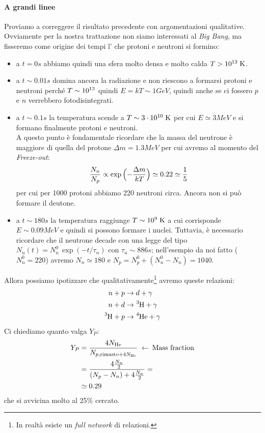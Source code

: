 \paragraph{A grandi linee}\label{a.grandi.linee} Proviamo a correggere il risultato precedente con argomentazioni qualitative. Ovviamente per la nostra trattazione non siamo interessati al \textit{Big Bang}, ma fisseremo come origine dei tempi l' che protoni e neutroni si formino: 
\begin{itemize}
    \item a $t=0\unit{s}$ abbiamo quindi una sfera molto densa e molto calda $T>10^{13}\;\mbox{K}$.  
    \item a $t\sim 0.01\unit{s}$ domina ancora la radiazione e non riescono a formarsi protoni e neutroni perché $T\sim10^{13}$ quindi $E=kT\sim 1\unit{GeV}$, quindi anche se ci fossero $p$ e $n$ verrebbero fotodisintegrati.
    \item a $t\sim 0.1\unit{s}$ la temperatura scende a $T\sim 3\cdot10^{10}\;\mbox{K}$ per cui $E\simeq 3\unit{MeV}$ e si formano finalmente protoni e neutroni.\\ 
    A questo punto è fondamentale ricordare che la massa del neutrone è maggiore di quella del protone $\Delta m = 1.3\unit{MeV}$ per cui avremo al momento del \textit{Freeze-out}:
    $$\frac{N_n}{N_p}\propto \exp{\Bigl ( -\frac{\Delta m}{kT} \Bigr )} \simeq 0.22 \simeq \frac{1}{5}$$
    per cui per 1000 protoni abbiamo 220 neutroni circa. Ancora non si può formare il deutone.
    \item a $t\sim 180\unit{s}$ la temperatura raggiunge $T\sim 10^{9}\;\mbox{K}$ a cui corrisponde $E\sim 0.09\unit{MeV}$ e quindi si possono formare i nuclei. Tuttavia, è necessario ricordare che il neutrone decade con una legge del tipo $N_n(t) = N_n^0 \, \exp{(-t/\tau_n)}$ con $\tau_n \sim 886\unit{s}$; nell'esempio da noi fatto ($N_n^0= 220$) avremo $N_n \simeq 180$ e $N_p = N_p^0 + (N_n^0-N_n) = 1040$.
\end{itemize}
\noindent Allora possiamo ipotizzare che qualitativamente\footnote{In realtà esiste un \textit{full network} di relazioni.} avremo queste relazioni:
\begin{displaymath}
\begin{aligned}
n + p &\to d + \gamma \\
n + d &\to \ce{^3H} + \gamma \\
\ce{^3H} + p &\to \ce{^4He} + \gamma
\end{aligned}
\end{displaymath}
Ci chiediamo quanto valga $Y_P$:
\begin{displaymath}
\begin{aligned}
Y_P &= \frac{4 N_{\ce{He}}}{N_{p,\text{rimasto} + 4N_{\ce{He}} }} \;\leftarrow\: \text{Mass fraction}\\
&= \frac{4 \frac{N_n}{2}}{(N_p - N_n) + 4\frac{N_n}{2}} = \\
&\simeq 0.29
\end{aligned}
\end{displaymath}
che si avvicina molto al 25\% cercato.




    